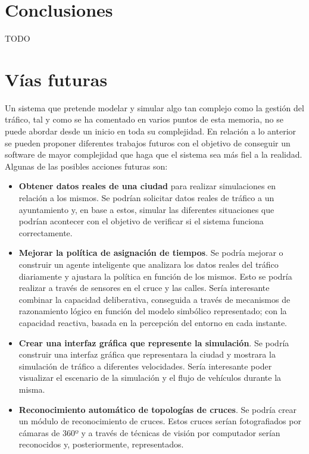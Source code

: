 \chapter{Conclusiones}
    \label{chap:eight}
TODO

\chapter{Vías futuras}
    \label{chap:nine}
Un sistema que pretende modelar y simular algo tan complejo como la gestión del tráfico, tal y como se ha comentado en varios puntos de esta memoria, no se puede abordar desde un inicio en toda su complejidad. En relación a lo anterior se pueden proponer diferentes trabajos futuros con el objetivo de conseguir un software de mayor complejidad que haga que el sistema sea más fiel a la realidad. Algunas de las posibles acciones futuras son:
\begin{itemize}
    \item\textbf{Obtener datos reales de una ciudad} para realizar simulaciones en relación a los mismos. Se podrían solicitar datos reales de tráfico a un ayuntamiento y, en base a estos, simular las diferentes situaciones que podrían acontecer con el objetivo de verificar si el sistema funciona correctamente.
    \item \textbf{Mejorar la política de asignación de tiempos}. Se podría mejorar o construir un agente inteligente que analizara los datos reales del tráfico diariamente y ajustara la política en función de los mismos. Esto se podría realizar a través de sensores en el cruce y las calles. Sería interesante combinar la capacidad deliberativa, conseguida a través de mecanismos de razonamiento lógico en función del modelo simbólico representado; con la capacidad reactiva, basada en la percepción del entorno en cada instante.
    \item \textbf{Crear una interfaz gráfica que represente la simulación}. Se podría construir una interfaz gráfica que representara la ciudad y mostrara la simulación de tráfico a diferentes velocidades. Sería interesante poder visualizar el escenario de la simulación y el flujo de vehículos durante la misma.
    \item \textbf{Reconocimiento automático de topologías de cruces}. Se podría crear un módulo de reconocimiento de cruces. Estos cruces serían fotografiados por cámaras de 360º y a través de técnicas de visión por computador serían reconocidos y, posteriormente, representados.
\end{itemize}
